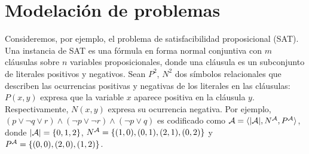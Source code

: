 \section{Modelación de problemas}
Consideremos, por ejemplo, el problema de satisfacibilidad
proposicional (SAT). Una instancia de SAT es una fórmula en forma normal
conjuntiva con $m$ cláusulas sobre $n$ variables proposicionales, donde una
cláusula es un subconjunto de literales positivos y negativos. 
Sean $P^2$, $N^2$ dos símbolos relacionales que describen las ocurrencias
positivas y negativas de los literales en las cláusulas: $P(x, y)$ expresa que
la variable $x$ aparece positiva en la cláusula $y$. Respectivamente, $N(x, y)$ expresa
su ocurrencia negativa.
Por ejemplo, $(p\lor \neg q\lor r)\land(\neg p\lor \neg r)\land(\neg p\lor q)$
es codificado como $\mathcal{A}=\langle |\mathcal{A}|,N^{\mathcal{A}},P^{\mathcal{A}} \rangle$, donde $|\mathcal{A}|=\{0,1,2\}$,
$N^{\mathcal{A}}=\{(1,0),(0,1),(2,1),(0,2)\}$ y $P^{\mathcal{A}}=\{(0,0),(2,0),(1,2)\}$.

%


